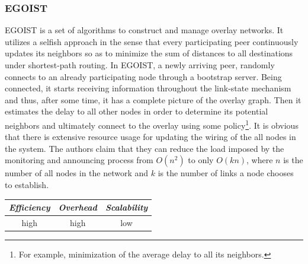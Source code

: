 \subsubsection{EGOIST}
EGOIST \cite{SLLBBR2008} is a set of algorithms to construct and manage overlay
networks. It utilizes a selfish approach in the sense that every participating
peer continuously updates its neighbors so as to minimize the sum of distances
to all destinations under shortest-path routing. In EGOIST, a newly arriving
peer, randomly connects to an already participating node through a bootstrap
server. Being connected, it starts receiving information throughout the
link-state mechanism and thus, after some time, it has a complete picture of the
overlay graph. Then it estimates the delay to all other nodes in order to
determine its potential neighbors and ultimately connect to the overlay using
some policy\footnote{For example, minimization of the average delay to all its
neighbors.}. It is obvious that there is extensive resource usage for updating
the wiring of the all nodes in the system. The authors claim that they can
reduce the load imposed by the monitoring and announcing process from $O(n^2)$
to only $O(kn)$, where $n$ is the number of all nodes in the network and $k$ is
the number of links a node chooses to establish.

\begin{center}
\begin{tabular}{ccc}
\emph{Efficiency} & \emph{Overhead} & \emph{Scalability} \\
\hline
high &
high &
low
\end{tabular}
\end{center}

